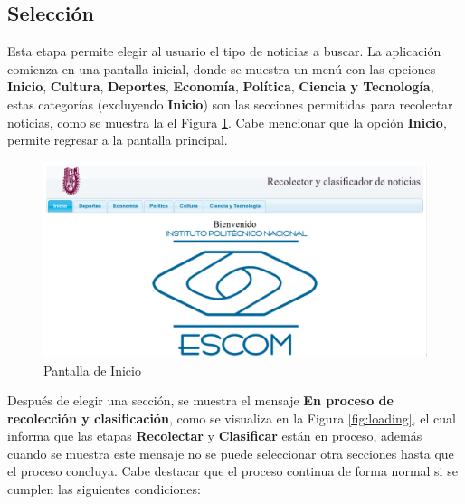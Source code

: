 %
%
%

\subsection{Selección}


Esta etapa permite elegir al usuario el tipo de noticias a buscar. La aplicación comienza en una pantalla inicial, donde se muestra un menú con las opciones \textbf{Inicio}, \textbf{Cultura}, \textbf{Deportes}, \textbf{Economía}, \textbf{Política}, \textbf{Ciencia y Tecnología}, estas categorías (excluyendo \textbf{Inicio}) son las secciones permitidas para recolectar noticias, como se muestra la el Figura \ref{fig:PantallaInicio}. Cabe mencionar que la opción \textbf{Inicio}, permite regresar a la pantalla principal.\\


\begin{figure}[H]
\centering
\includegraphics[scale=0.29]{imagenes/Capitulo5/pantallaPrincipal.png}
\caption{Pantalla de Inicio}
\label{fig:PantallaInicio}
\end{figure}

Después de elegir una sección, se muestra el mensaje \textbf{En proceso de recolección y clasificación}, como se visualiza en la Figura \ref{fig:loading}, el cual informa que las etapas \textbf{Recolectar} y \textbf{Clasificar} están en proceso, además cuando se muestra este mensaje no se puede seleccionar otra secciones hasta que el proceso concluya. Cabe destacar que el proceso continua de forma normal si se cumplen las siguientes condiciones:

